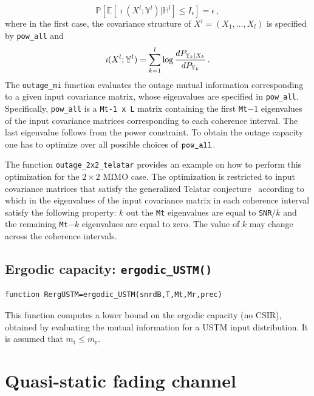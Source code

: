 \documentclass[a4paper,11p]{memoir}
\def\txant{m_{\mathrm{t}}} %
\def\rxant{m_{\mathrm{r}}} %
\def\tfdiv{l}  %
\def\PP{\mathbb{P}}
\def\EE{\mathbb{E}}
\begin{document}
$$ \PP[ \EE[\imath(X^\tfdiv; \mathbb{Y}^\tfdiv)|\mathbb{H}^\tfdiv] \le
I_\epsilon] = \epsilon\,, $$
where in the first case, the covariance structure of $X^\tfdiv=(X_1,\ldots,X_\tfdiv)$ is specified by \verb|pow_all| and 
$$\imath(X^\tfdiv; \mathbb{Y}^\tfdiv) = \sum_{k=1}^\tfdiv \log {dP_{\mathbb{Y}_k|X_k}\over dP_{\mathbb{Y}_k}}\,.$$
%
The \verb|outage_mi| function evaluates the outage mutual information corresponding to a given input covariance matrix, whose eigenvalues are specified in \verb|pow_all|. Specifically, \verb|pow_all| is a \verb|Mt-1 x L| matrix containing the
first \verb|Mt|$-1$ eigenvalues of the input covariance matrices corresponding to each coherence interval. The last eigenvalue follows from the power constraint. To obtain the outage capacity one has to optimize over all possible choices of $\verb|pow_all|$.

The function \verb|outage_2x2_telatar| provides an example on how to perform this optimization for the $2\times 2$ MIMO case. The optimization is restricted to input covariance matrices that satisfy the generalized Telatar conjecture~\cite[Eq.~(42)]{durisi14-12a} according to which in 
the eigenvalues of the input covariance matrix in each coherence interval satisfy the following property: $k$ out the \verb|Mt| eigenvalues are equal to \verb|SNR|$/k$ and the remaining \verb|Mt|$-k$ eigenvalues are equal to zero. The value of $k$ may change across the coherence intervals.


\section[Ergodic capacity]{Ergodic capacity: \texttt{ergodic\_USTM()}}
\begin{verbatim}
function RergUSTM=ergodic_USTM(snrdB,T,Mt,Mr,prec)
\end{verbatim}
This function computes a lower bound on the ergodic capacity (no CSIR), obtained by evaluating the mutual information for a USTM input distribution. 
It is assumed that $\txant\leq\rxant$.


\chapter{Quasi-static fading channel}
\end{document}
